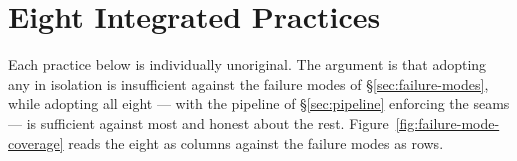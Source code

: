 \section{Eight Integrated Practices}
\label{sec:eight}


Each practice below is individually unoriginal. The argument is
that adopting any in isolation is insufficient against the failure
modes of \S\ref{sec:failure-modes}, while adopting all eight ---
with the pipeline of \S\ref{sec:pipeline} enforcing the seams ---
is sufficient against most and honest about the rest.
Figure~\ref{fig:failure-mode-coverage} reads the eight as columns
against the failure modes as rows.

